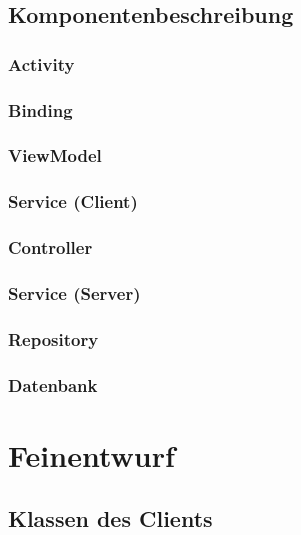 \documentclass[a4paper]{scrreprt}
\begin{document}
	 \section{Komponentenbeschreibung}
		 \subsection{Activity}
		 \subsection{Binding}
		 \subsection{ViewModel}
	 	 \subsection{Service (Client)}
	 	 \subsection{Controller}
	 	 \subsection{Service (Server)}
	 	 \subsection{Repository}
	 	 \subsection{Datenbank}

        
\newpage

\chapter{Feinentwurf}
	\section{Klassen des Clients}
\end{document}

